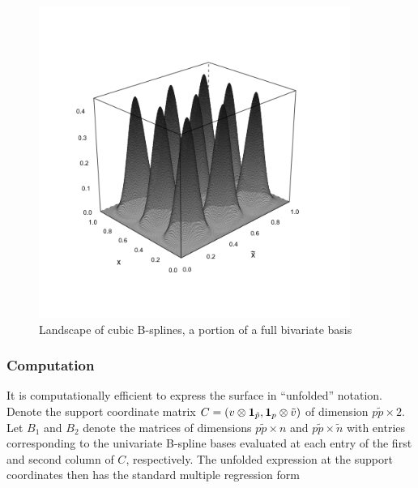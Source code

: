 \documentclass[12pt]{article}
\newcommand*\needsparaphrased{\color{red}}
\newcommand*\outlineskeleton{\color{green}}
\newcommand{\bfone}{\mbox{\boldmath $1$}}
\begin{document}

\begin{figure}[H]
  \centering
  \graphicspath{{img/}}
  \includegraphics[width=4in,height=4in]{sparse_bicubic_basis.png}
  \caption{Landscape of cubic B-splines, a portion of a full bivariate basis}\label{fig:sparse_bicubic_basis}
\end{figure}

\subsubsection{{\outlineskeleton Computation}}

It is computationally efficient to express the surface in ``unfolded'' notation. Denote the support coordinate matrix  $C = \left(v \otimes \bfone_{\tilde{p}}, \bfone_p \otimes \tilde{v}\right)$ of dimension $p\tilde{p} \times 2$. Let $B_1$ and $B_2$ denote the matrices of dimensions $p\tilde{p} \times n$ and $p\tilde{p} \times \tilde{n}$ with entries corresponding to the univariate B-spline bases evaluated at each entry of the first and second column of $C$, respectively. {\needsparaphrased The unfolded expression at the support coordinates then has the standard multiple regression form}
\end{document}
